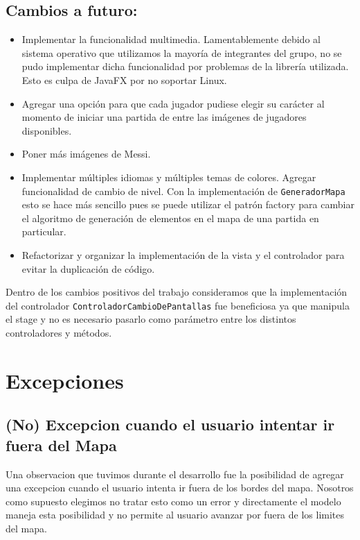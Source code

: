 \documentclass[titlepage,a4paper]{article}
\begin{document}
\subsection{Cambios a futuro:}
\label{sec:org95a852f}

\begin{itemize}
\item Implementar la funcionalidad multimedia. Lamentablemente debido al
sistema operativo que utilizamos la mayoría de integrantes del grupo,
no se pudo implementar dicha funcionalidad por problemas de la
librería utilizada. Esto es culpa de JavaFX por no soportar Linux.

\item Agregar una opción para que cada jugador pudiese elegir su carácter al
momento de iniciar una partida de entre las imágenes de jugadores
disponibles.

\item Poner más imágenes de Messi.

\item Implementar múltiples idiomas y múltiples temas de colores.
Agregar funcionalidad de cambio de nivel. Con la implementación de
\texttt{GeneradorMapa} esto se hace más sencillo pues se puede utilizar el
patrón factory para cambiar el algoritmo de generación de elementos en
el mapa de una partida en particular.

\item Refactorizar y organizar la implementación de la vista y el
controlador para evitar la duplicación de código.
\end{itemize}

Dentro de los cambios positivos del trabajo consideramos que la
implementación del controlador \texttt{ControladorCambioDePantallas} fue
beneficiosa ya que manipula el stage y no es necesario pasarlo como
parámetro entre los distintos controladores y métodos.

\section{Excepciones}
\label{sec:org4ca64e9}
\subsection{(No) Excepcion cuando el usuario intentar ir fuera del Mapa}
\label{sec:org4e4c150}

Una observacion que tuvimos durante el desarrollo fue la posibilidad
de agregar una excepcion cuando el usuario intenta ir fuera de los
bordes del mapa. Nosotros como supuesto elegimos no tratar esto como
un error y directamente el modelo maneja esta posibilidad y no permite
al usuario avanzar por fuera de los limites del mapa.
\end{document}
